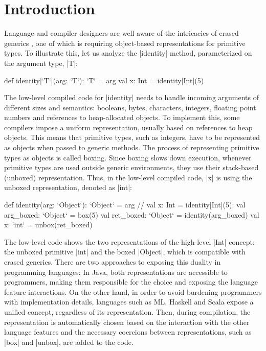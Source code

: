 
\section{Introduction}
\label{ldl:sec:Intro}

Language and compiler designers are well aware of the intricacies of erased generics \cite{leroy-unboxed-objects, morrison-napier88, harper-intensional-type-analysis, java-erasure, dot-net-generics, iuli-thesis, miniboxing, spj-unboxed-values}, one of which is requiring object-based representations for primitive types. To illustrate this, let us analyze the |identity| method, parameterized on the argument type, |T|:

\begin{lstlisting-nobreak}
 def identity[`T`](arg: `T`): `T` = arg
 val x: Int = identity[Int](5)
\end{lstlisting-nobreak}

The low-level compiled code for |identity| needs to handle incoming arguments of different sizes and semantics: booleans, bytes, characters, integers, floating point numbers and references to heap-allocated objects. To implement this, some compilers impose a uniform representation, usually based on references to heap objects. This means that primitive types, such as integers, have to be represented as objects when passed to generic methods. The process of representing primitive types as objects is called boxing. Since boxing slows down execution, whenever primitive types are used outside generic environments, they use their stack-based (unboxed) representation. Thus, in the low-level compiled code, |x| is using the unboxed representation, denoted as |int|:

\begin{lstlisting-nobreak}
 def identity(arg: `Object`): `Object` = arg
 // val x: Int = identity[Int](5):
 val arg_boxed: `Object` = box(5)
 val ret_boxed: `Object` = identity(arg_boxed)
 val x: `int` = unbox(ret_boxed)
\end{lstlisting-nobreak}

The low-level code shows the two representations of the high-level |Int| concept: the unboxed primitive |int| and the boxed |Object|, which is compatible with erased generics. There are two approaches to exposing this duality in programming languages: In Java, both representations are accessible to programmers, making them responsible for the choice and exposing the language feature interactions. On the other hand, in order to avoid burdening programmers with implementation details, languages such as ML, Haskell and Scala expose a unified concept, regardless of its representation. Then, during compilation, the representation is automatically chosen based on the interaction with the other language features and the necessary coercions between representations, such as |box| and |unbox|, are added to the code.

